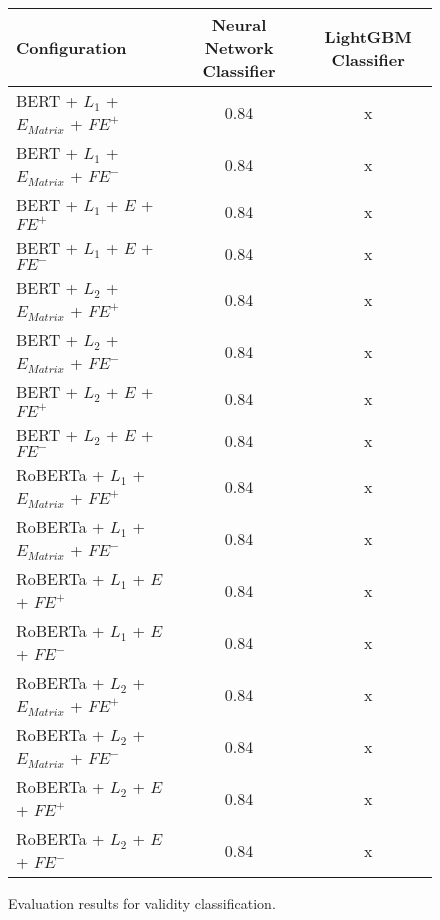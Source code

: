 \begin{figure}[H]
  \begin{center}
  	\renewcommand{\arraystretch}{1.2}
   	\begin{tabular}{|| l || c | c ||}
   	\hline
   	{\small Configuration} & {\small Neural Network Classifier} & {\small LightGBM Classifier} \\
   	\hline\hline
   	BERT + $L_1$ + $E_{Matrix}$ + $\textit{FE}^+$ & 0.84 & x \\
 	\hline
 	BERT + $L_1$ + $E_{Matrix}$ + $\textit{FE}^-$ & 0.84 & x \\
 	\hline
 	BERT + $L_1$ + $E$ + $\textit{FE}^+$ & 0.84 & x \\
 	\hline
 	BERT + $L_1$ + $E$ + $\textit{FE}^-$ & 0.84 & x \\
 	\hline
 	BERT + $L_2$ + $E_{Matrix}$ + $\textit{FE}^+$ & 0.84 & x \\
 	\hline
 	BERT + $L_2$ + $E_{Matrix}$ + $\textit{FE}^-$ & 0.84 & x \\
 	\hline
 	BERT + $L_2$ + $E$ + $\textit{FE}^+$ & 0.84 & x \\
 	\hline
 	BERT + $L_2$ + $E$ + $\textit{FE}^-$ & 0.84 & x \\
 	\hline
 	RoBERTa + $L_1$ + $E_{Matrix}$ + $\textit{FE}^+$ & 0.84 & x \\
 	\hline
 	RoBERTa + $L_1$ + $E_{Matrix}$ + $\textit{FE}^-$ & 0.84 & x \\
 	\hline
 	RoBERTa + $L_1$ + $E$ + $\textit{FE}^+$ & 0.84 & x \\
 	\hline
 	RoBERTa + $L_1$ + $E$ + $\textit{FE}^-$ & 0.84 & x \\
 	\hline
 	RoBERTa + $L_2$ + $E_{Matrix}$ + $\textit{FE}^+$ & 0.84 & x \\
 	\hline
 	RoBERTa + $L_2$ + $E_{Matrix}$ + $\textit{FE}^-$ & 0.84 & x \\
 	\hline
 	RoBERTa + $L_2$ + $E$ + $\textit{FE}^+$ & 0.84 & x \\
 	\hline
 	RoBERTa + $L_2$ + $E$ + $\textit{FE}^-$ & 0.84 & x \\
 	\hline
	\end{tabular}
	\renewcommand{\arraystretch}{1}
  \end{center}
  \caption{Evaluation results for validity classification.}%
  \label{fig:validityresults}
\end{figure}

